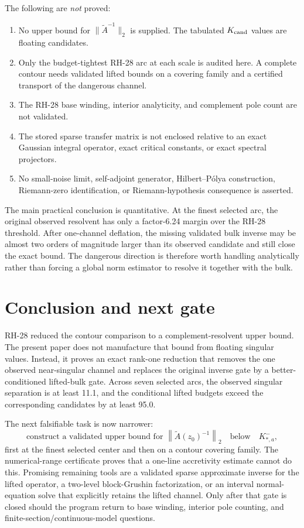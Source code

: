 \documentclass[11pt]{article}
\theoremstyle{definition}
\theoremstyle{remark}
\newcommand{\norm}[1]{\left\lVert#1\right\rVert}
\newcommand{\Atilde}{\widetilde A}
\begin{document}
The following are \emph{not} proved:
\begin{enumerate}
 \item No upper bound for $\|\Atilde^{-1}\|_2$ is supplied.  The tabulated
       $K_{\rm cand}$ values are floating candidates.
 \item Only the budget-tightest RH-28 arc at each scale is audited here.  A
       complete contour needs validated lifted bounds on a covering family
       and a certified transport of the dangerous channel.
 \item The RH-28 base winding, interior analyticity, and complement pole
       count are not validated.
 \item The stored sparse transfer matrix is not enclosed relative to an
       exact Gaussian integral operator, exact critical constants, or exact
       spectral projectors.
 \item No small-noise limit, self-adjoint generator, Hilbert--Pólya
       construction, Riemann-zero identification, or Riemann-hypothesis
       consequence is asserted.
\end{enumerate}

The main practical conclusion is quantitative.  At the finest selected arc,
the original observed resolvent has only a factor-6.24 margin over the RH-28
threshold.  After one-channel deflation, the missing validated bulk inverse
may be almost two orders of magnitude larger than its observed candidate and
still close the exact bound.  The dangerous direction is therefore worth
handling analytically rather than forcing a global norm estimator to resolve
it together with the bulk.


\section{Conclusion and next gate}
\label{sec:conclusion}

RH-28 reduced the contour comparison to a complement-resolvent upper bound.
The present paper does not manufacture that bound from floating singular
values.  Instead, it proves an exact rank-one reduction that removes the one
observed near-singular channel and replaces the original inverse gate by a
better-conditioned lifted-bulk gate.  Across seven selected arcs, the
observed singular separation is at least 11.1, and the conditional lifted
budgets exceed the corresponding candidates by at least 95.0.

The next falsifiable task is now narrower:
\begin{equation}
 \text{construct a validated upper bound for }
 \norm{\Atilde(z_0)^{-1}}_2
 \quad\text{below}\quad K_{*,a}^-,
 \label{eq:next-gate}
\end{equation}
first at the finest selected center and then on a contour covering family.
The numerical-range certificate proves that a one-line accretivity estimate
cannot do this.  Promising remaining tools are a validated sparse
approximate inverse for the lifted operator, a two-level block-Grushin
factorization, or an interval normal-equation solve that explicitly retains
the lifted channel.  Only after that gate is closed should the program return
to base winding, interior pole counting, and finite-section/continuous-model
questions.
\end{document}
